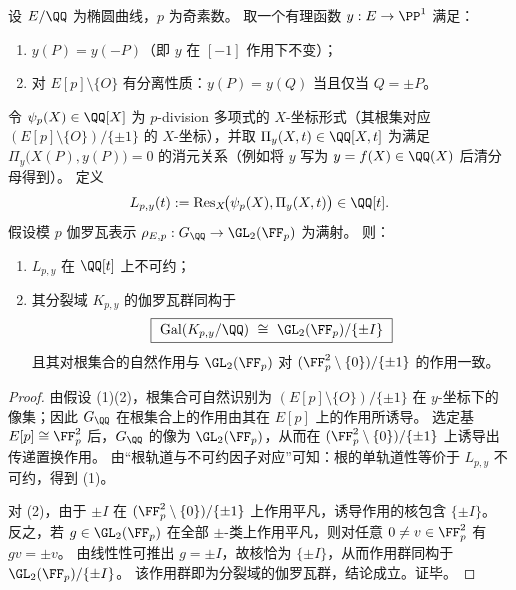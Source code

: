

\begin{proposition}\label{prop:conclusion-elliptic-ptorsion-elimination-galois-gl2-modpm}
设 \(E/\QQ\) 为椭圆曲线，\(p\) 为奇素数。
取一个有理函数 \(y:E\to\PP^1\) 满足：
\begin{enumerate}
  \item \(y(P)=y(-P)\)（即 \(y\) 在 \([-1]\) 作用下不变）；
  \item 对 \(E[p]\setminus\{O\}\) 有分离性质：\(y(P)=y(Q)\) 当且仅当 \(Q=\pm P\)。
\end{enumerate}
令 \(\psi_p(X)\in\QQ[X]\) 为 \(p\)-division 多项式的 \(X\)-坐标形式（其根集对应 \((E[p]\setminus\{O\})/\{\pm1\}\) 的 \(X\)-坐标），并取 \(\Pi_y(X,t)\in\QQ[X,t]\) 为满足 \(\Pi_y\bigl(X(P),y(P)\bigr)=0\) 的消元关系（例如将 \(y\) 写为 \(y=f(X)\in\QQ(X)\) 后清分母得到）。
定义
\[
L_{p,y}(t):=\operatorname{Res}_{X}\!\bigl(\psi_p(X),\Pi_y(X,t)\bigr)\in\QQ[t].
\]
假设模 \(p\) 伽罗瓦表示
\(
\rho_{E,p}:G_{\QQ}\to \GL_2(\FF_p)
\)
为满射。
则：
\begin{enumerate}
  \item \(L_{p,y}\) 在 \(\QQ[t]\) 上不可约；
  \item 其分裂域 \(K_{p,y}\) 的伽罗瓦群同构于
  \[
  \boxed{\ \mathrm{Gal}(K_{p,y}/\QQ)\ \cong\ \GL_2(\FF_p)/\{\pm I\}\ }
  \]
  且其对根集合的自然作用与 \(\GL_2(\FF_p)\) 对 \((\FF_p^2\setminus\{0\})/\{\pm1\}\) 的作用一致。
\end{enumerate}
\end{proposition}
\begin{proof}
由假设 (1)(2)，根集合可自然识别为 \((E[p]\setminus\{O\})/\{\pm1\}\) 在 \(y\)-坐标下的像集；因此 \(G_{\QQ}\) 在根集合上的作用由其在 \(E[p]\) 上的作用所诱导。
选定基 \(E[p]\cong \FF_p^2\) 后，\(G_{\QQ}\) 的像为 \(\GL_2(\FF_p)\)，从而在 \((\FF_p^2\setminus\{0\})/\{\pm1\}\) 上诱导出传递置换作用。
由“根轨道与不可约因子对应”可知：根的单轨道性等价于 \(L_{p,y}\) 不可约，得到 (1)。
\par
对 (2)，由于 \(\pm I\) 在 \((\FF_p^2\setminus\{0\})/\{\pm1\}\) 上作用平凡，诱导作用的核包含 \(\{\pm I\}\)。
反之，若 \(g\in\GL_2(\FF_p)\) 在全部 \(\pm\)-类上作用平凡，则对任意 \(0\neq v\in\FF_p^2\) 有 \(gv=\pm v\)。
由线性性可推出 \(g=\pm I\)，故核恰为 \(\{\pm I\}\)，从而作用群同构于 \(\GL_2(\FF_p)/\{\pm I\}\)。
该作用群即为分裂域的伽罗瓦群，结论成立。证毕。
\end{proof}

